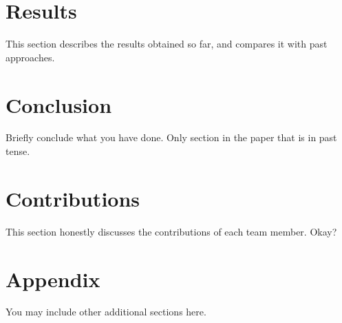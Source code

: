 \documentclass{article} %
\begin{document}
\section{Results}

This section describes the results 
obtained so far, and compares
it with past approaches. 

\section*{Conclusion}
Briefly conclude what you have done. Only section in the paper that is in past tense.

\section*{Contributions}
This section honestly discusses the contributions 
of each team member. Okay?





\appendix
\section{Appendix}
You may include other additional sections here.
\end{document}
